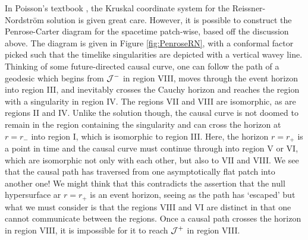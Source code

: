 In Poisson's textbook \cite{Poisson:2009pwt}, the Kruskal coordinate system for the Reissner-Nordstr\"om solution is given great care. However, it is possible to construct the Penrose-Carter diagram for the spacetime patch-wise, based off the discussion above. The diagram is given in Figure \ref{fig:PenroseRN}, with a conformal factor picked such that the timelike singularities are depicted with a vertical wavey line. Thinking of some future-directed causal curve, one can follow the path of a geodesic which begins from ${\cal J}^-$ in region VIII, moves through the event horizon into region III, and inevitably crosses the Cauchy horizon and reaches the region with a singularity in region IV. The regions VII and VIII are isomorphic, as are regions II and IV. Unlike the \sch solution though, the causal curve is not doomed to remain in the region containing the singularity and can cross the horizon at $r = r_-$ into region I, which is isomorphic to region III. Here, the horizon $r = r_+$ is a point in time and the causal curve must continue through into region V or VI, which are isomorphic not only with each other, but also to VII and VIII. We see that the causal path has traversed from one asymptotically flat patch into another one! We might think that this contradicts the assertion that the null hypersurface ar $r = r_+$ is an event horizon, seeing as the path has `escaped' but what we must consider is that the regions VIII and VI are distinct in that one cannot communicate between the regions. Once a causal path crosses the horizon in region VIII, it is impossible for it to reach ${\cal J}^+$ in region VIII. 


